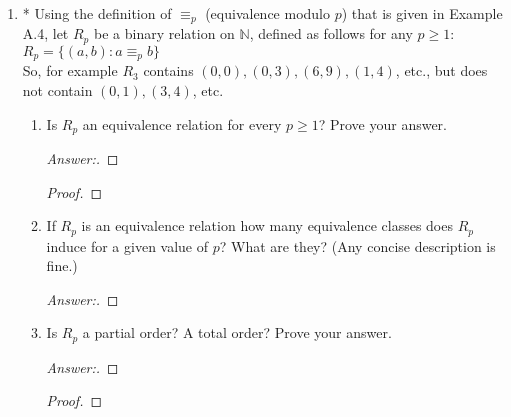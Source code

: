 \documentclass[10pt]{article}
\newcommand{\nat}{\mathbb{N}}
\begin{document}
\begin{enumerate}
\addtocounter{enumi}{1}
\item
* Using the definition of $\equiv _p$ (equivalence modulo $p$) that is given in Example A.4, let $R_p$ be a binary relation on $\nat$, defined as follows for any $p \geq 1$: \\
$R_p = \{(a, b): a \equiv _p b \}$ \\
So, for example $R_3$ contains $(0, 0), (0, 3), (6, 9), (1, 4)$, etc., but does not contain $(0, 1), (3, 4)$, etc.
\begin{enumerate}
\item
Is $R_p$ an equivalence relation for every $p \geq 1$? Prove your answer.
\begin{proof}[Answer:]
\end{proof}
\begin{proof}
\end{proof}
\item
If $R_p$ is an equivalence relation how many equivalence classes does $R_p$ induce for a given value of $p$? What are they?  (Any concise description is fine.)
\begin{proof}[Answer:]
\end{proof}
\item
Is $R_p$ a partial order?  A total order?  Prove your answer.
\begin{proof}[Answer:]
\end{proof}
\begin{proof}
\end{proof}
\end{enumerate}




\end{enumerate}
\end{document}
